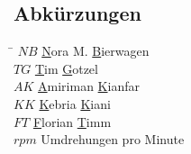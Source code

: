 \subsection*{Abk\"urzungen}
\begin{tabbing}
\hspace*{2cm}\=\kill
$NB$ \> \underline{N}ora M. \underline{B}ierwagen \\[0.2ex]
$TG$ \> \underline{T}im \underline{G}otzel \\[0.2ex]
$AK$ \> \underline{A}miriman \underline{K}ianfar \\[0.2ex]
$KK$ \> \underline{K}ebria \underline{K}iani \\[0.2ex]
$FT$ \> \underline{F}lorian \underline{T}imm \\[0.2ex]
$rpm$ \> Umdrehungen pro Minute \\[0.2ex]
\end{tabbing}

